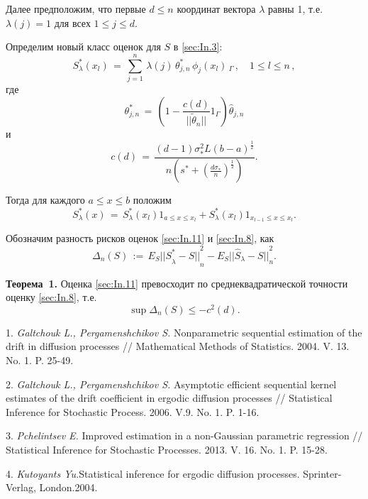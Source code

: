 Далее предположим, что первые $d \leqslant  n$ координат вектора $\lambda$ равны 1, т.е. $\lambda(j)=1$ для всех $1 \leqslant j \leqslant d$.

Определим новый класс оценок для $S$ в \eqref{sec:In.3}:
\begin{equation}\label{sec:In.8}
 {{S}}^*_{\lambda}(x_{l})\,=\,\sum^n_{j=1}\,\lambda(j)\,{\theta}^*_{j,n}\,\phi_{j}(x_{l})\,
_{\Gamma}\,,\quad 1\leqslant l\leqslant n\,,
\end{equation}
где
\begin{equation}\label{sec:In.9}
{\theta}^*_{j,n}\,=\,\left( 1-\frac{c(d)}{||\widetilde{\theta}_{n}||}
1_{\Gamma} \right)\hat {\theta}_{j,n}
\end{equation}
и
\begin{equation}\label{sec:In.10}
c(d)\,=\,\frac{(d-1){\sigma}^2_*L(b-a)^{\frac{1}{2}}}{n(s^*+({\frac {d \sigma_*}{n} })^{\frac{1}{2}})}.
\end{equation}

Тогда для каждого $a \leqslant x \leqslant b$  положим
\begin{equation}\label{sec:In.11}
{{S}}^*_{\lambda}(x)\,=\,{{S}}^*_{\lambda}(x_{l}) 1_{a \leqslant x \leqslant  x_{l}}
+{{S}}^*_{\lambda}(x_{l}) 1_{x_{l-1} \leqslant x \leqslant  x_{l}}.
\end{equation}

Обозначим разность рисков оценок \eqref{sec:In.11} и \eqref{sec:In.8}, как
 \begin{equation}\label{sec:In.12}
\Delta_n (S)\,:=\,E_S {{||{S}}^*_{\lambda}-S||}^2 _n -E_S {||\hat {{S}}_{\lambda}-S||}^2 _n.
\end{equation}

\textbf{Теорема~1.}
Оценка \eqref{sec:In.11} превосходит по среднеквадратической точности оценку \eqref{sec:In.8}, т.е.
\begin{equation}
\sup \Delta_n (S) \leqslant -c^2 (d).
\end{equation}


\litlist

1. {\it Galtchouk L., Pergamenshchikov S.} Nonparametric sequential estimation of the drift in diffusion processes // Mathematical Methods of Statistics. 2004. V. 13. No. 1. P. 25-49.

2. {\it Galtchouk L., Pergamenshchikov S.} Asymptotic efficient sequential kernel estimates of the drift coefficient in ergodic diffusion processes // Statistical Inference for Stochastic Process. 2006. V.9. No. 1. P. 1-16.

3. {\it Pchelintsev E.} Improved estimation in a non-Gaussian parametric regression //
Statistical Inference for Stochastic Processes. 2013. V. 16. No. 1. P. 15-28.

4. {\it Kutoyants Yu.}Statistical inference for ergodic diffusion processes. Sprinter-Verlag, London.2004.

